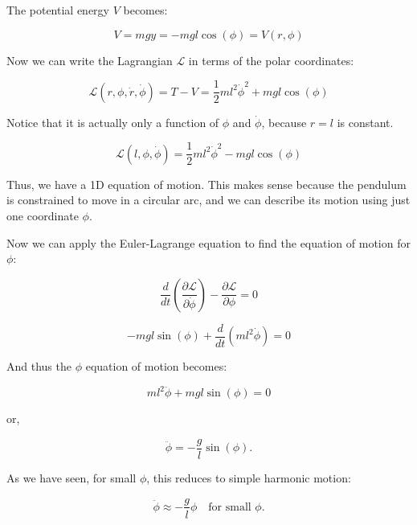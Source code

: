\documentclass[11pt]{article}
\begin{document}
The potential energy \(V\) becomes:

\[V = mgy = - mg l \cos(\phi) = V(r, \phi)\]

Now we can write the Lagrangian \(\mathcal{L}\) in terms of the polar
coordinates:

\[
\mathcal{L}(r, \phi, \dot{r}, \dot{\phi}) = T - V = \frac{1}{2} m l^2 \dot{\phi}^2 + mgl \cos(\phi)
\]

Notice that it is actually only a function of \(\phi\) and
\(\dot{\phi}\), because \(r=l\) is constant.

\[\mathcal{L}(l, \phi, \dot{\phi}) = \frac{1}{2} m l^2 \dot{\phi}^2 - mgl \cos(\phi)\]

Thus, we have a 1D equation of motion. This makes sense because the
pendulum is constrained to move in a circular arc, and we can describe
its motion using just one coordinate \(\phi\).

Now we can apply the Euler-Lagrange equation to find the equation of
motion for \(\phi\):

\[
\frac{d}{dt} \left( \frac{\partial \mathcal{L}}{\partial \dot{\phi}} \right) - \frac{\partial \mathcal{L}}{\partial \phi} = 0
\]

\[-mgl \sin(\phi) + \frac{d}{dt} (ml^2 \dot{\phi}) = 0\]

And thus the \(\phi\) equation of motion becomes:

\[ml^2 \ddot{\phi} + mgl \sin(\phi) = 0\]

or,

\[\ddot{\phi} = - \frac{g}{l} \sin(\phi).\]

As we have seen, for small \(\phi\), this reduces to simple harmonic
motion:

\[\ddot{\phi} \approx -\frac{g}{l} \phi \quad \text{for small } \phi.\]

    


    
    
    
\end{document}
